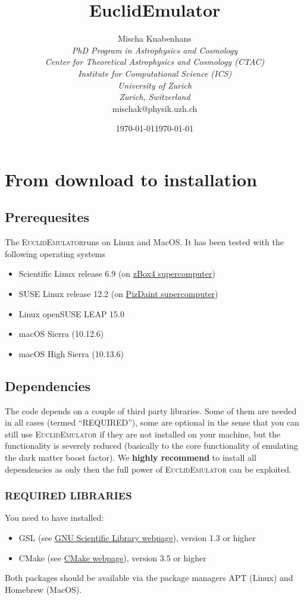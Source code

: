 \documentclass[american,11pt]{article}
\title{EuclidEmulator}
\author{Mischa Knabenhans\\
{\it PhD Program in Astrophysics and Cosmology}\\
{\it Center for Theoretical Astrophysics and Cosmology (CTAC)}\\
{\it Institute for Computational Science (ICS)}\\
{\it University of Zurich}\\
{\it Zurich, Switzerland}\\
mischak@physik.uzh.ch}
\date{\today}
\date{\today}                                           %
\begin{document}
\maketitle

\tableofcontents

\section{From download to installation}
\subsection{Prerequesites}
The \textsc{EuclidEmulator}runs on Linux and MacOS. It has been tested with the following operating systems 

\begin{itemize}
\item Scientific Linux release 6.9 (on \href{https://www.ics.uzh.ch/~stadel/doku.php?id=zbox:zbox4}{zBox4 supercomputer})
\item SUSE Linux release 12.2 (on \href{https://www.cscs.ch/computers/piz-daint/}{PizDaint supercomputer})
\item Linux openSUSE LEAP 15.0
\item macOS Sierra (10.12.6) 
\item macOS High Sierra (10.13.6)
\end{itemize}

\subsection{Dependencies}
The code depends on a couple of third party libraries. Some of them are needed in all cases (termed ``REQUIRED''), some are optional in the sense that you can still use \textsc{EuclidEmulator} if they are not installed on your machine, but the functionality is severely reduced (basically to the core functionality of emulating the dark matter boost factor). We \textbf{highly recommend} to install all dependencies as only then the full power of  \textsc{EuclidEmulator} can be exploited.

\subsubsection{REQUIRED LIBRARIES}
You need to have installed:
\begin{itemize}
\item GSL (see \href{ https://www.gnu.org/software/gsl/}{GNU Scientific Library webpage}), version 1.3 or higher
\item CMake (see \href{https://cmake.org}{CMake webpage}), version 3.5 or higher
\end{itemize}
Both packages should be available via the package managers APT (Linux) and Homebrew (MacOS). 
\end{document}
